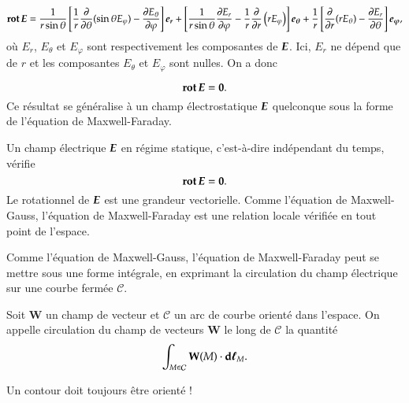 \begin{equation*}
	\rot \vece = \dfrac{1}{r \sin \theta}\left[\dfrac{1}{r}
		\dfrac{\partial}{\ddtheta}(\sin \theta E_\varphi) - 
	        \dfrac{\partial E_\theta}{\ddphi}\right]\er + 
		\left[\dfrac{1}{r\sin \theta}\dfrac{\partial E_r}{\ddphi} -
		\dfrac{1}{r}\dfrac{\partial}{\ddr}\left(rE_\varphi\right)\right]\etheta
		+ \dfrac{1}{r}\left[\dfrac{\partial}{\ddr}(r E_\theta)
		- \dfrac{\partial E_r}{\ddtheta}\right]\ephi,
\end{equation*}
où $E_r$, $E_\theta$ et $E_\varphi$ sont respectivement les composantes de
$\vece$. Ici, $E_r$ ne dépend que de $r$ et les composantes $E_\theta$ et 
$E_\varphi$ sont nulles. On a donc 

\begin{equation*}
	\rot \vece = \mitbf{0}.
\end{equation*}
Ce résultat se généralise à un champ électrostatique $\vece$ quelconque sous la
forme de l'équation de Maxwell-Faraday.

\begin{defn}
	Un champ électrique $\vece$ en régime statique, c'est-à-dire
	indépendant du temps, vérifie 
	\begin{equation}
		\rot \vece = \mitbf{0}.
	\end{equation}
	Le rotationnel de $\vece$ est une grandeur vectorielle. Comme
	l'équation de Maxwell-Gauss, l'équation de Maxwell-Faraday est 
	une relation locale vérifiée
	en tout point de l'espace.
\end{defn}

Comme l'équation de Maxwell-Gauss, l'équation de Maxwell-Faraday peut se mettre 
sous une forme intégrale, en exprimant la circulation du champ électrique sur
une courbe fermée $\mathcal{C}$.

\begin{defn}
	Soit $\mathbf{W}$ un champ de vecteur et $\mathcal{C}$ un arc de courbe orienté 
	dans l'espace. On appelle circulation du champ de vecteurs $\mathbf{W}$
	le long de $\mathcal{C}$ la quantité
	\begin{equation*}
		\int_{M \in \mathcal{C}} \mathbf{W}(M) \cdot \dl_M.
	\end{equation*}
\end{defn}

\begin{attention}
	Un contour doit toujours être orienté !
\end{attention}

